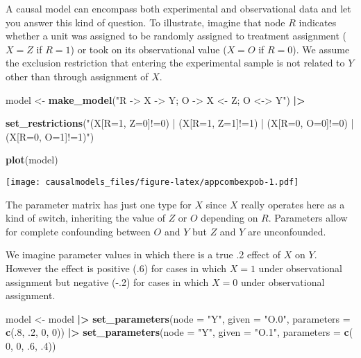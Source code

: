 \documentclass[
  12pt,
]{book}
\newenvironment{Shaded}{\begin{snugshade}}{\end{snugshade}}
\newcommand{\AttributeTok}[1]{\textcolor[rgb]{0.13,0.29,0.53}{#1}}
\newcommand{\DecValTok}[1]{\textcolor[rgb]{0.00,0.00,0.81}{#1}}
\newcommand{\FunctionTok}[1]{\textcolor[rgb]{0.13,0.29,0.53}{\textbf{#1}}}
\newcommand{\NormalTok}[1]{#1}
\newcommand{\OtherTok}[1]{\textcolor[rgb]{0.56,0.35,0.01}{#1}}
\newcommand{\SpecialCharTok}[1]{\textcolor[rgb]{0.81,0.36,0.00}{\textbf{#1}}}
\newcommand{\StringTok}[1]{\textcolor[rgb]{0.31,0.60,0.02}{#1}}
\begin{document}
A causal model can encompass both experimental and observational data and let you answer this kind of question. To illustrate, imagine that node \(R\) indicates whether a unit was assigned to be randomly assigned to treatment assignment (\(X=Z\) if \(R=1\)) or took on its observational value (\(X=O\) if \(R=0\)). We assume the exclusion restriction that entering the experimental sample is not related to \(Y\) other than through assignment of \(X\).

\begin{Shaded}
\begin{Highlighting}[]
\NormalTok{model }\OtherTok{\textless{}{-}} \FunctionTok{make\_model}\NormalTok{(}\StringTok{"R {-}\textgreater{} X {-}\textgreater{} Y; O {-}\textgreater{} X \textless{}{-} Z; O \textless{}{-}\textgreater{} Y"}\NormalTok{) }\SpecialCharTok{|\textgreater{}}
  
    \FunctionTok{set\_restrictions}\NormalTok{(}\StringTok{"(X[R=1, Z=0]!=0) | (X[R=1, Z=1]!=1) | (X[R=0, O=0]!=0) | (X[R=0, O=1]!=1)"}\NormalTok{)}

\FunctionTok{plot}\NormalTok{(model)}
\end{Highlighting}
\end{Shaded}

\texttt{[image: causalmodels\_files/figure-latex/appcombexpob-1.pdf]}

The parameter matrix has just one type for \(X\) since \(X\) really operates here as a kind of switch, inheriting the value of \(Z\) or \(O\) depending on \(R\). Parameters allow for complete confounding between \(O\) and \(Y\) but \(Z\) and \(Y\) are unconfounded.

We imagine parameter values in which there is a true .2 effect of \(X\) on \(Y\). However the effect is positive (.6) for cases in which \(X=1\) under observational assignment but negative (-.2) for cases in which \(X=0\) under observational assignment.

\begin{Shaded}
\begin{Highlighting}[]
\NormalTok{model }\OtherTok{\textless{}{-}}\NormalTok{ model }\SpecialCharTok{|\textgreater{}}
    \FunctionTok{set\_parameters}\NormalTok{(}\AttributeTok{node =} \StringTok{"Y"}\NormalTok{, }\AttributeTok{given =} \StringTok{"O.0"}\NormalTok{, }\AttributeTok{parameters =} \FunctionTok{c}\NormalTok{(.}\DecValTok{8}\NormalTok{, .}\DecValTok{2}\NormalTok{,  }\DecValTok{0}\NormalTok{,  }\DecValTok{0}\NormalTok{)) }\SpecialCharTok{|\textgreater{}}
    \FunctionTok{set\_parameters}\NormalTok{(}\AttributeTok{node =} \StringTok{"Y"}\NormalTok{, }\AttributeTok{given =} \StringTok{"O.1"}\NormalTok{, }\AttributeTok{parameters =} \FunctionTok{c}\NormalTok{( }\DecValTok{0}\NormalTok{,  }\DecValTok{0}\NormalTok{, .}\DecValTok{6}\NormalTok{, .}\DecValTok{4}\NormalTok{))}
\end{Highlighting}
\end{Shaded}
\end{document}
